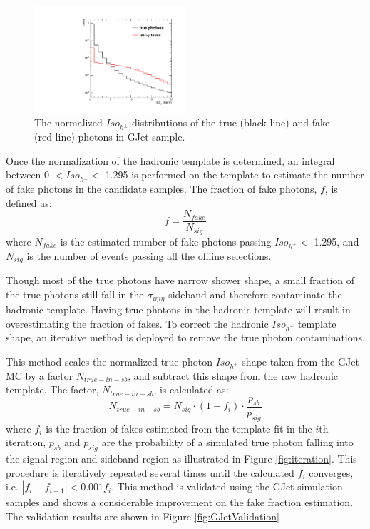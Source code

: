 \documentclass[thesis.tex]{subfiles}
\renewcommand\_{\textunderscore\allowbreak}
\begin{document}
\begin{figure}[hbt]
  \centering
    \includegraphics[width=0.5\textwidth]{Figures/PLOT_JetPhoTemplate.pdf}
  \caption{The normalized $Iso_{h^\pm}$ distributions of the true (black line) and fake (red line) photons in GJet sample.}
    \label{fig:fakeinGJet}
\end{figure}

Once the normalization of the hadronic template is determined, an integral between 0 $< Iso_{h^\pm} <$ 1.295 is performed on the template to estimate the number of fake photons in the candidate samples. The fraction of fake photons, $f$, is defined as: 
\begin{equation}
		f = \frac{N_{fake}}{N_{sig}}
\end{equation}
where $N_{fake}$ is the estimated number of fake photons passing $Iso_{h^\pm} < $ 1.295, and $N_{sig}$ is the number of events passing all the offline selections. 

Though most of the true photons have narrow shower shape, a small fraction of the true photons still fall in the $\sigma_{i\eta i\eta}$ sideband and therefore contaminate the hadronic template. Having true photons in the hadronic template will result in overestimating the fraction of fakes. To correct the hadronic $Iso_{h^\pm}$ template shape, an iterative method is deployed to remove the true photon contaminations.

This method scales the normalized true photon $Iso_{h^\pm}$ shape taken from the GJet MC by a factor $N_{true-in-sb}$, and subtract this shape from the raw hadronic template. The factor, $N_{true-in-sb}$,  is calculated as:
\begin{equation}
		N_{true-in-sb} = N_{sig} \cdot (1-f_i) \cdot \frac{p_{sb}}{p_{sig}}
\end{equation}
where $f_i$ is the fraction of fakes estimated from the template fit in the $i$th iteration, $p_{sb}$ and $p_{sig}$ are the probability of a simulated true photon falling into the signal region and sideband region as illustrated in Figure \ref{fig:iteration}. This procedure is iteratively repeated several times until the calculated $f_i$ converges, i.e. $|f_i - f_{i+1}| < 0.001f_i$. This method is validated using the GJet simulation samples and shows a considerable improvement on the fake fraction estimation. The validation results are shown in Figure \ref{fig:GJetValidation} .
\end{document}
